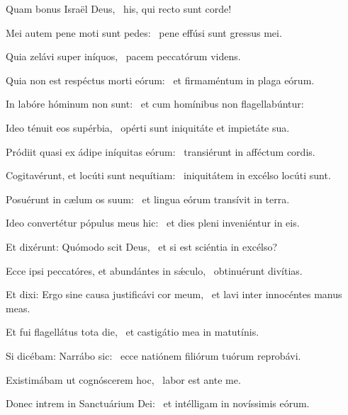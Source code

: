 \item Quam bonus Israël Deus,~\psstar{} his, qui recto sunt corde!

\item Mei autem pene moti sunt pedes:~\psstar{} pene effúsi sunt gressus mei.

\item Quia zelávi super iníquos,~\psstar{} pacem peccatórum videns.

\item Quia non est respéctus morti eórum:~\psstar{} et firmaméntum in plaga eórum.

\item In labóre hóminum non sunt:~\psstar{} et cum homínibus non flagellabúntur:

\item Ideo ténuit eos supérbia,~\psstar{} opérti sunt iniquitáte et impietáte sua.

\item Pródiit quasi ex ádipe iníquitas eórum:~\psstar{} transiérunt in afféctum cordis.

\item Cogitavérunt, et locúti sunt nequítiam:~\psstar{} iniquitátem in excélso locúti sunt.

\item Posuérunt in cælum os suum:~\psstar{} et lingua eórum transívit in terra.

\item Ideo convertétur pópulus meus hic:~\psstar{} et dies pleni inveniéntur in eis.

\item Et dixérunt: Quómodo scit Deus,~\psstar{} et si est sciéntia in excélso?

\item Ecce ipsi peccatóres, et abundántes in sǽculo,~\psstar{} obtinuérunt divítias.

\item Et dixi: Ergo sine causa justificávi cor meum,~\psstar{} et lavi inter innocéntes manus meas.

\item Et fui flagellátus tota die,~\psstar{} et castigátio mea in matutínis.

\item Si dicébam: Narrábo sic:~\psstar{} ecce natiónem filiórum tuórum reprobávi.

\item Existimábam ut cognóscerem hoc,~\psstar{} labor est ante me.

\item Donec intrem in Sanctuárium Dei:~\psstar{} et intélligam in novíssimis eórum.

